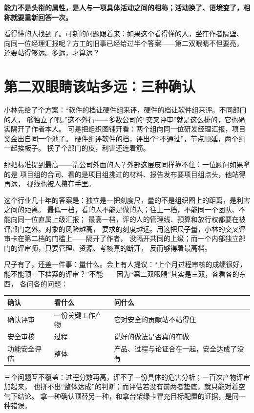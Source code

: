 \textbf{能力不是头衔的属性，是人与一项具体活动之间的相称；活动换了、语境变了，相称就要重新回答一次。}

看得懂的人找到了。可新的问题跟着来：如果这个看得懂的人，坐在作者隔壁、
向同一位经理汇报呢？方工的旧事已经给过半个答案——第二双眼睛不但要亮，
还要站得够远。多远，才算远？

\section{第二双眼睛该站多远：三种确认}

小林先给了个方案：“软件的档让硬件组来评，硬件的档让软件组来评。不同部门的人，
够独立了吧。”这不外行——多数公司的“交叉评审”就是这么排的，它也确实隔开了作者本人。
可是把组织图铺开看：两个组向同一位研发经理汇报，项目奖金出自同一个池子。
硬件组评软件的档，评出个“不通过”，节点顺延，两个组一起挨板子。
换了个部门的皮，利害还连着筋。

那把标准提到最高——请公司外面的人？外部这层皮同样靠不住：一位顾问如果拿的是
项目组的合同、看的是项目组挑过的材料、报告发布要项目组点头，他站得再远，
视线也被人攥在手里。

这个行业几十年的答案是：独立是一把刻度尺，量的不是组织图上的距离，是利害之间的距离。
最低一档，看的人不能是做的人；往上一档，不能同一个团队、不能向同一位直属上级汇报；
最高一档，评的人的管理线、预算和放行权都要在被评部门之外。对象的风险越高，
要求的刻度越远。用这把尺子量，小林的交叉评审卡在第二档的门槛上——隔开了作者，
没隔开共同的上级；而一个内部独立部门的评审师，只要管理、资源、考核真的断开，
反而够得着最高档。

尺子有了，还差一件事：量什么。会上有人提议：“上个月过程审核的成绩很好，
能不能顶一下档案的评审？”不能——因为“第二双眼睛”其实是三双，各看各的东西，
各问各的问题：

\begin{center}
\begingroup\small
\setlength{\tabcolsep}{4pt}
\begin{tabularx}{\linewidth}{@{}XXX@{}}
\toprule
确认 & 看什么 & 问什么 \\
\midrule
确认评审 & 一份关键工作产物 & 它对安全的贡献站不站得住 \\
安全审核 & 过程 & 说好的做法是否真的在做 \\
功能安全评估 & 整体 & 产品、过程与论证合在一起，安全达成了没有 \\
\bottomrule
\end{tabularx}
\endgroup
\end{center}

三个问题互不覆盖：过程分数再高，评不了一份具体的危害分析；一百次产物评审加起来，
也拼不出“整体达成”的判断；而评估若没有前两者垫底，就只能对着空气下结论。
拿一种确认顶替另一种，和拿台架绿卡冒充目标配置的证据，是同一种错误。

